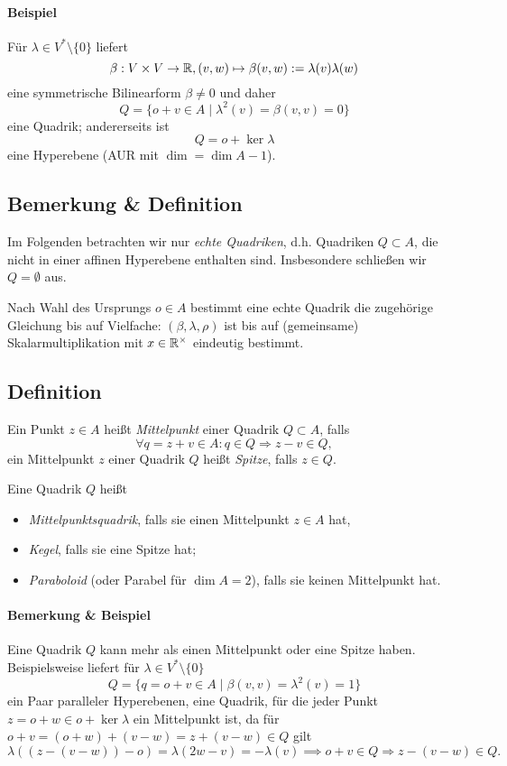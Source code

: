 \paragraph{Beispiel}
	Für $ \lambda\in V^*\setminus\{0\} $ liefert
		\[ \beta:V\times V\to \mathbb{R}, (v,w)\mapsto \beta(v,w):=\lambda(v)\lambda(w) \]
	eine symmetrische Bilinearform $ \beta\neq 0 $ und daher
		\[ Q=\{o+v\in A\mid \lambda^2(v)=\beta(v,v) = 0 \} \]
	eine Quadrik; andererseits ist 
		\[ Q = o+\ker \lambda \]
	eine Hyperebene (AUR mit $ \dim = \dim A-1 $).
\subsection{Bemerkung \& Definition}
\begin{Definition}
	Im Folgenden betrachten wir nur \emph{echte Quadriken}, d.h. Quadriken $ Q\subset A $, die nicht in einer affinen Hyperebene enthalten sind.
	Insbesondere schließen wir $ Q=\emptyset $ aus. 
\end{Definition}

	Nach Wahl des Ursprungs $ o\in A $ bestimmt eine echte Quadrik die zugehörige Gleichung bis auf Vielfache: $ (\beta,\lambda,\rho) $ ist bis auf (gemeinsame) Skalarmultiplikation mit $ x\in\mathbb{R}^\times  $ eindeutig bestimmt.
\subsection{Definition}
\begin{Definition}
	Ein Punkt $ z\in A $ heißt \emph{Mittelpunkt} einer Quadrik $ Q\subset A $, falls
		\[ \forall q=z+v\in A: q\in Q\Rightarrow z-v\in Q, \]
	ein Mittelpunkt $ z $ einer Quadrik $ Q $ heißt \emph{Spitze}, falls $ z\in Q $.
\end{Definition}	
\begin{Definition}

	Eine Quadrik $ Q $ heißt
	\begin{itemize}
		\item \emph{Mittelpunktsquadrik}, falls sie einen Mittelpunkt $ z\in A $ hat,
		\item \emph{Kegel}, falls sie eine Spitze hat; 
		\item \emph{Paraboloid} (oder Parabel für $ \dim A = 2 $), falls sie keinen Mittelpunkt hat.
	\end{itemize}
\end{Definition}	
\paragraph{Bemerkung \& Beispiel}
	Eine Quadrik $ Q $ kann mehr als einen Mittelpunkt oder eine Spitze haben.
	Beispielsweise liefert für $ \lambda\in V^*\setminus\{0\} $
		\[ Q = \{q=o+v\in A\mid \beta(v,v) = \lambda^2(v) = 1\} \]
	ein Paar paralleler Hyperebenen, eine Quadrik, für die jeder Punkt $ z = o+w \in o+\ker \lambda $ ein Mittelpunkt ist, da für $ o+v = (o+w)+(v-w) = z+(v-w)\in Q $ gilt
		\[ \lambda\left((z-(v-w))-o\right) = \lambda(2w-v) = -\lambda(v)\implies o+v\in Q\Rightarrow z-(v-w)\in Q. \]
